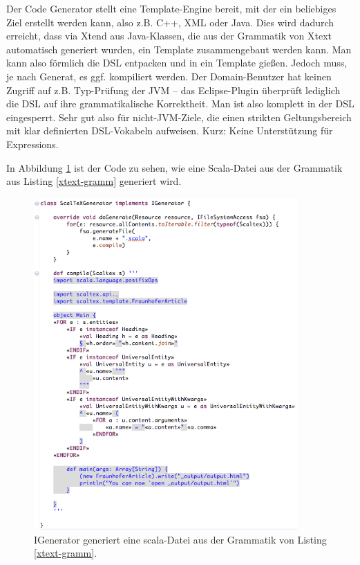 Der Code Generator stellt eine Template-Engine bereit, mit der
ein beliebiges Ziel erstellt werden kann, also z.B. C++, XML oder Java.
Dies wird dadurch erreicht, dass via Xtend aus Java-Klassen, die aus der
Grammatik von Xtext automatisch generiert wurden, ein Template zusammengebaut
werden kann. Man kann also förmlich die DSL entpacken und in ein Template
gießen.
Jedoch muss, je nach Generat, es ggf. kompiliert werden. Der
Domain-Benutzer hat keinen Zugriff auf z.B. Typ-Prüfung der JVM --
das Eclipse-Plugin überprüft lediglich die DSL auf ihre
grammatikalische Korrektheit. Man ist also komplett in der DSL eingesperrt.
Sehr gut also für nicht-JVM-Ziele, die einen strikten Geltungsbereich mit
klar definierten DSL-Vokabeln aufweisen. Kurz: Keine Unterstützung für
Expressions.\cite{xtext}

In Abbildung \ref{fig-igenerator} ist der Code zu sehen, wie eine
Scala-Datei aus der Grammatik aus Listing \ref{xtext-gramm} generiert wird.

\begin{figure}[h!]
  \centering
    \includegraphics[width=0.9\textwidth]{figures/igenerator.png}
  \caption{IGenerator generiert eine scala-Datei aus der Grammatik von Listing \ref{xtext-gramm}.}\label{fig-igenerator}
\end{figure}

